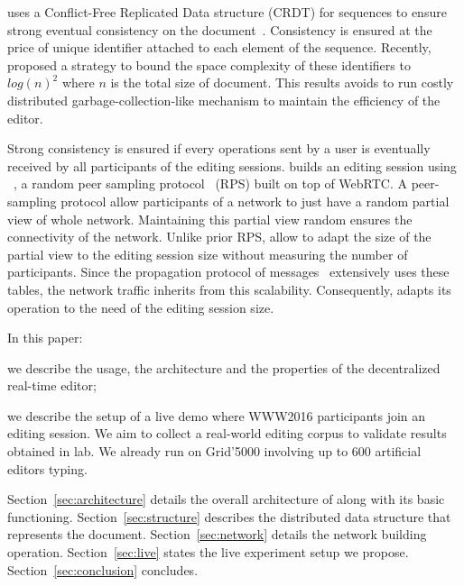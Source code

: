 \CRATE uses a Conflict\--Free Replicated Data structure (CRDT) for
sequences to ensure strong eventual consistency on the
document~\cite{shapiro2011comprehensive}. Consistency is ensured at
the price of unique identifier attached to each element of the
sequence. Recently, \LSEQ~\cite{nedelec2013lseq} proposed a strategy
to bound the space complexity of these identifiers to $log(n)^2$ where
$n$ is the total size of document. This results avoids to run costly
distributed garbage-collection-like mechanism to maintain the
efficiency of the editor.

Strong consistency is ensured if every operations sent by a user is
eventually received by all participants of the editing
sessions. \CRATE builds an editing session using
\SPRAY~\cite{nedelec2015spray}, a random peer sampling
protocol~\cite{jelasity2007gossip} (RPS) built on top of WebRTC. A
peer-sampling protocol allow participants of a network to just have a
random partial view of whole network. Maintaining this partial view
random ensures the connectivity of the network. Unlike prior RPS,
\SPRAY allow to adapt the size of the partial view to the editing
session size without measuring the number of participants. Since the
propagation protocol of messages~\cite{birman1999bimodal} extensively
uses these tables, the network traffic inherits from this
scalability. Consequently, \CRATE adapts its operation to the need of
the editing session size.

In this paper:
\begin{inparaenum}[(i)]
\item we describe the usage, the architecture and the properties of
  the \CRATE decentralized real-time editor;
\item we describe the setup of a live demo where WWW2016 participants
  join an editing session. We aim to collect a real-world editing
  corpus to validate results obtained in lab. We already run \CRATE on
  Grid'5000 involving up to 600 artificial editors typing.
\end{inparaenum}

Section~\ref{sec:architecture} details the overall architecture of \CRATE along
with its basic functioning. Section~\ref{sec:structure} describes the
distributed data structure that represents the
document. Section~\ref{sec:network} details the network building
operation. Section~\ref{sec:live} states the live experiment setup we
propose. Section~\ref{sec:conclusion} concludes.

